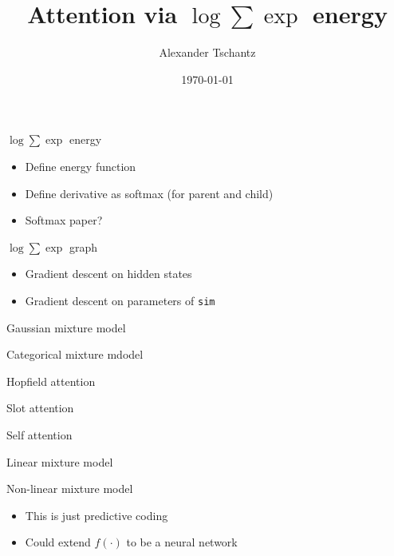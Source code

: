 \documentclass{beamer}
\title{Attention via $\log \sum \exp$ energy}
\author{Alexander Tschantz}
\date{\today}
\begin{document}
\begin{frame}
    \titlepage
\end{frame}

\begin{frame}{$\log \sum \exp$ energy}
    \begin{itemize}
        \item Define energy function 
        \item Define derivative as softmax (for parent and child)
        \item Softmax paper?
    \end{itemize}
\end{frame}

\begin{frame}{$\log \sum \exp$ graph}
    \begin{itemize}
        \item Gradient descent on hidden states
        \item Gradient descent on parameters of \texttt{sim}
    \end{itemize}
\end{frame}

\begin{frame}{Gaussian mixture model}
\end{frame}

\begin{frame}{Categorical mixture mdodel}
\end{frame}

\begin{frame}{Hopfield attention}
\end{frame}

\begin{frame}{Slot attention}
\end{frame}

\begin{frame}{Self attention}
\end{frame}

\begin{frame}{Linear mixture model}
\end{frame}

\begin{frame}{Non-linear mixture model}
   \begin{itemize}
        \item This is just predictive coding 
        \item Could extend $f(\cdot)$ to be a neural network
   \end{itemize}
\end{frame}
\end{document}
